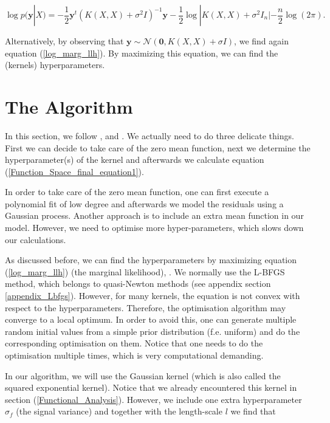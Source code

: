 \documentclass[12pt,a4paper,oneside]{book}
\begin{document}
\begin{equation}\label{log_marg_llh}
\log p(\bm{y}|X) = -\dfrac{1}{2} \bm{y}^t (K(X,X) + \sigma^2 I)^{-1} \bm{y} -\dfrac{1}{2} \log |K(X,X) + \sigma^2 I_n| - \dfrac{n}{2}  \log(2 \pi).
\end{equation}

Alternatively, by observing that $\bm{y} \sim \mathcal{N}(\bm{0},K(X,X) + \sigma I)$, we find again equation (\ref{log_marg_llh}). By maximizing this equation, we can find the (kernels) hyperparameters. 


\section{The Algorithm}

In this section, we follow \cite{GPRbook}, \cite{de2018machine} and \cite{chen2018priors}. We actually need to do three delicate things. First we can decide to take care of the zero mean function, next we determine the hyperparameter(s) of the kernel and afterwards we calculate equation (\ref{Function_Space_final_equation1}). 

In order to take care of the zero mean function, one can first execute a polynomial fit of low degree and afterwards we model the residuals using a Gaussian process. Another approach is to include an extra mean function in our model. However, we need to optimise more hyper-parameters, which slows down our calculations. 

As discussed before, we can find the hyperparameters by maximizing equation (\ref{log_marg_llh}) (the marginal likelihood), . We normally use the L-BFGS method, which belongs to quasi-Newton methods (see appendix section \ref{appendix_Lbfgs}). However, for many kernels, the equation is not convex with respect to the hyperparameters. Therefore, the optimisation algorithm may converge to a local optimum. In order to avoid this, one can generate multiple random initial values from a simple prior distribution (f.e. uniform) and do the corresponding optimisation on them. Notice that one needs to do the optimisation multiple times, which is very computational demanding.

In our algorithm, we will use the Gaussian kernel (which is also called the squared exponential kernel). Notice that we already encountered this kernel in section (\ref{Functional_Analysis}). However, we include one extra hyperparameter $\sigma_f$ (the signal variance) and together with the length-scale $l$ we find that 
\end{document}
